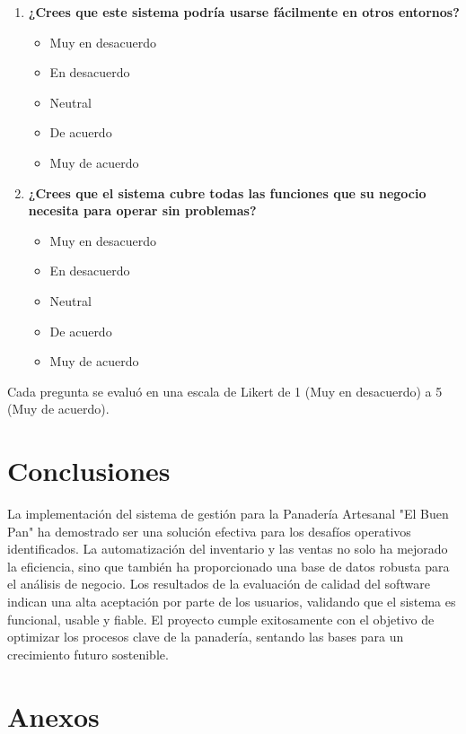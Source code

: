 \documentclass[conference]{IEEEtran}
\begin{document}
\begin{enumerate}
    \item \textbf{¿Crees que este sistema podría usarse fácilmente en otros entornos?}
        \begin{itemize}
            \item Muy en desacuerdo
            \item En desacuerdo
            \item Neutral
            \item De acuerdo
            \item Muy de acuerdo
        \end{itemize}
        
    \item \textbf{¿Crees que el sistema cubre todas las funciones que su negocio necesita para operar sin problemas?}
        \begin{itemize}
            \item Muy en desacuerdo
            \item En desacuerdo
            \item Neutral
            \item De acuerdo
            \item Muy de acuerdo
        \end{itemize}
\end{enumerate}

Cada pregunta se evaluó en una escala de Likert de 1 (Muy en desacuerdo) a 5 (Muy de acuerdo).
\section{Conclusiones}
La implementación del sistema de gestión para la Panadería Artesanal "El Buen Pan" ha demostrado ser una solución efectiva para los desafíos operativos identificados. La automatización del inventario y las ventas no solo ha mejorado la eficiencia, sino que también ha proporcionado una base de datos robusta para el análisis de negocio. Los resultados de la evaluación de calidad del software indican una alta aceptación por parte de los usuarios, validando que el sistema es funcional, usable y fiable. El proyecto cumple exitosamente con el objetivo de optimizar los procesos clave de la panadería, sentando las bases para un crecimiento futuro sostenible.

\section{Anexos}
\end{document}
